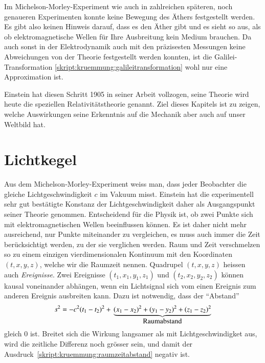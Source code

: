 Im Michelson-Morley-Experiment wie auch in zahlreichen späteren, noch
genaueren Experimenten konnte keine Bewegung des Äthers festgestellt
werden.
Es gibt also keinen Hinweis darauf, dass es den Äther gibt und es
sieht so aus, als ob elektromagnetische Wellen für Ihre Ausbreitung
kein Medium brauchen.
Da auch sonst in der Elektrodynamik auch mit den präzisesten Messungen
keine Abweichungen von der Theorie festgestellt werden konnten,
ist die Galilei-Transformation
\eqref{skript:kruemmung:galileitransformation} wohl nur eine
Approximation ist.

Einstein hat diesen Schritt 1905 in seiner Arbeit \cite{skript:einstein}
vollzogen, seine Theorie wird heute die speziellen Relativitätstheorie genannt.
Ziel dieses Kapitels ist zu zeigen, welche Auswirkungen seine
Erkenntnis auf die Mechanik aber auch auf unser Weltbild hat.

\section{Lichtkegel%
\label{skript:speziell:section:lichtkegel}}
Aus dem Michelson-Morley-Experiment weiss man, dass jeder Beobachter
die gleiche Lichtgeschwindigkeit $c$ im Vakuum misst.
Einstein hat die experimentell sehr gut bestätigte Konstanz der
Lichtgeschwindigkeit daher als Ausgangspunkt seiner Theorie genommen.
Entscheidend für die Physik ist, ob zwei Punkte sich mit elektromagnetischen
Wellen beeinflussen können.
Es ist daher nicht mehr ausreichend, nur Punkte miteinander zu vergleichen,
es muss auch immer die Zeit berücksichtigt werden, zu der sie verglichen
werden.
Raum und Zeit verschmelzen so zu einem einzigen vierdimensionalen
Kontinuum mit den Koordinaten $(t,x,y,z)$, welche wir die Raumzeit
nennen.
%
Quadrupel $(t,x,y,z)$ heissen auch {\em Ereignisse}.
Zwei Ereignisse $(t_1,x_1,y_1,z_1)$ und $(t_2,x_2,y_2,z_2)$ können
kausal voneinander abhängen, wenn ein Lichtsignal sich vom einen Ereignis
zum anderen Ereignis ausbreiten kann.
Dazu ist notwendig, dass der ``Abstand''
\begin{equation}
s^2
=
-c^2(t_1-t_2)^2
+
\mathstrut
\underbrace{
(x_1-x_2)^2
+
(y_1-y_2)^2
+
(z_1-z_2)^2}_{\displaystyle\text{Raumabstand}}
\label{skript:kruemmung:raumzeitabstand}
\end{equation}
gleich $0$ ist.
Breitet sich die Wirkung langsamer als mit Lichtgeschwindigket aus,
wird die zeitliche Differenz noch grösser sein, und damit der
Ausdruck~\eqref{skript:kruemmung:raumzeitabstand} negativ ist.

